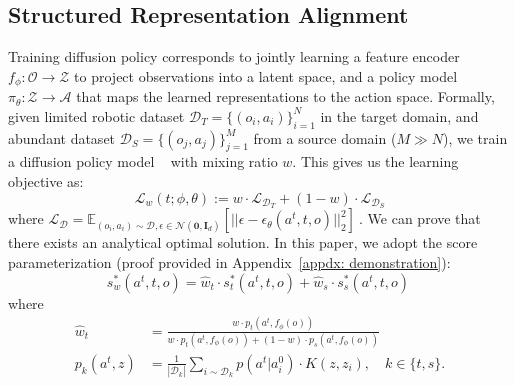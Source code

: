\subsection{Structured Representation Alignment}
\label{sec: condition representation}
Training diffusion policy corresponds to jointly learning a feature encoder $f_\phi:\mathcal{O}\rightarrow\mathcal{Z}$ to project observations into a latent space, and a policy model $\pi_\theta:\mathcal{Z}\rightarrow\mathcal{A}$ that maps the learned representations to the action space.
Formally, given limited robotic dataset $\mathcal{D}_T=\{(o_i, a_i)\}_{i=1}^N$ in the target domain, and abundant dataset $\mathcal{D}_S=\{(o_j, a_j)\}_{j=1}^M$ from a source domain ($M \gg N$), we train a diffusion policy model ~\cite{chi2025diffusion} with mixing ratio $w$. 
This gives us the learning objective as:
\begin{equation}
    \mathcal{L}_{w}(t; \phi,\theta) := w \cdot \mathcal{L}_{\mathcal{D}_T} + (1-w) \cdot \mathcal{L}_{\mathcal{D}_S}
\label{eq: cotrain dp}
\end{equation}
where $\mathcal{L}_{\mathcal{D}} = \mathbb{E}_{(o_i, a_i) \sim \mathcal{D}, \epsilon \in \mathcal{N}(\mathbf{0}, \mathbf{I}_d)} [||\epsilon - \epsilon_\theta(a^t, t, o)||_2^2]~$.
We can prove that there exists an analytical optimal solution.
In this paper, we adopt the score parameterization (proof provided in Appendix~\ref {appdx: demonstration}):
\begin{equation}
    s_w^*(a^t,t,o)=\hat{w}_t\cdot s_t^*(a^t,t,o) + \hat{w}_s\cdot s_s^*(a^t,t,o)~
\end{equation}
where 
\begin{equation}
\begin{aligned}
    \hat{w}_t
    &= \frac{w\cdot p_t(a^t,f_\phi(o))}
    {w\cdot p_t(a^t,f_\phi(o)) + (1-w)\cdot p_s(a^t,f_\phi(o))} \\
    p_k(a^t, z)
    &= \frac{1}{|\mathcal{D}_k|}
    \sum_{i\sim \mathcal{D}_k}
    p(a^t|a_i^0)\cdot K(z, z_i),
    \quad k\in\{t,s\}.
\end{aligned}
\label{eq: conditional w}
\end{equation}


